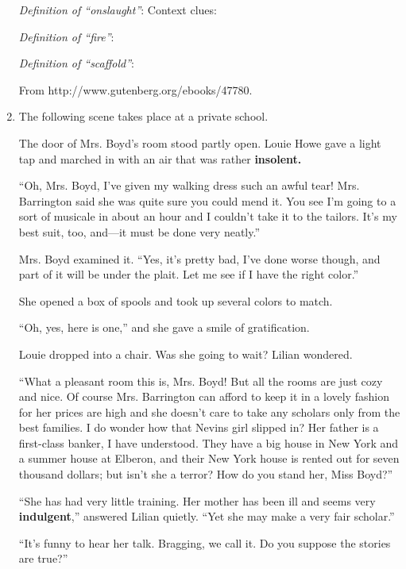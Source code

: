 \begin{enumerate}
\textit{Definition of ``onslaught''}: \hrulefill
Context clues: \hrulefill

\textit{Definition of ``fire''}: \hrulefill

\hrulefill

\textit{Definition of ``scaffold''}: \hrulefill

\hrulefill

From http://www.gutenberg.org/ebooks/47780.

\item The following scene takes place at a private school.

\begin{linenumbers}
\modulolinenumbers[5]
The door of Mrs. Boyd's room stood partly open. Louie Howe gave a light tap and marched in with an air that was rather \textbf{insolent.}

``Oh, Mrs. Boyd, I've given my walking dress such an awful tear! Mrs. Barrington said she was quite sure you could mend it. You see I’m going to a sort of musicale in about an hour and I couldn't take it to the tailors. It's my best suit, too, and—it must be done very neatly.''

Mrs. Boyd examined it. ``Yes, it's pretty bad, I've done worse though, and part of it will be under the plait. Let me see if I have the right color.''

She opened a box of spools and took up several colors to match.

``Oh, yes, here is one,'' and she gave a smile of gratification.

Louie dropped into a chair. Was she going to wait? Lilian wondered.

``What a pleasant room this is, Mrs. Boyd! But all the rooms are just cozy and nice. Of course Mrs. Barrington can afford to keep it in a lovely fashion for her prices are high and she doesn't care to take any scholars only from the best families. I do wonder how that Nevins girl slipped in? Her father is a first-class banker, I have understood. They have a big house in New York and a summer house at Elberon, and their New York house is rented out for seven thousand dollars; but isn't she a terror? How do you stand her, Miss Boyd?''

``She has had very little training. Her mother has been ill and seems very \textbf{indulgent},'' answered Lilian quietly. ``Yet she may make a very fair scholar.''

``It's funny to hear her talk. Bragging, we call it. Do you suppose the stories are true?''


\end{linenumbers}
\end{enumerate}
